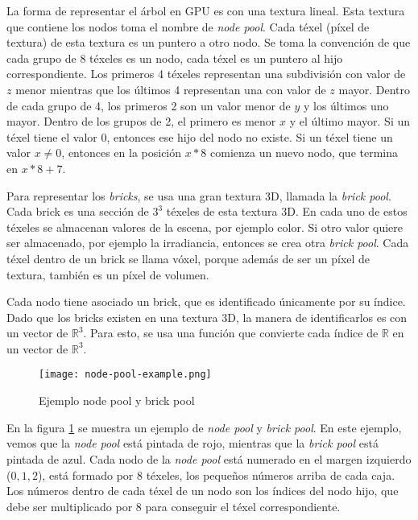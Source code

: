 La forma de representar el árbol en GPU es con una textura lineal.
Esta textura que contiene los nodos toma el nombre de \textit{node pool}.
Cada téxel (píxel de textura) de esta textura es un puntero a otro nodo.
Se toma la convención de que cada grupo de 8 téxeles es un nodo, cada téxel es un puntero al hijo correspondiente.
Los primeros 4 téxeles representan una subdivisión con valor de $z$ menor mientras que los últimos 4 representan una con valor de $z$ mayor.
Dentro de cada grupo de 4, los primeros 2 son un valor menor de $y$ y los últimos uno mayor.
Dentro de los grupos de 2, el primero es menor $x$ y el último mayor.
Si un téxel tiene el valor $0$, entonces ese hijo del nodo no existe.
Si un téxel tiene un valor $x \not = 0$, entonces en la posición $x * 8$ comienza un nuevo nodo, que termina en $x * 8 + 7$.

Para representar los \textit{bricks}, se usa una gran textura 3D, llamada la \textit{brick pool}.
Cada brick es una sección de $3^3$ téxeles de esta textura 3D.
En cada uno de estos téxeles se almacenan valores de la escena, por ejemplo color.
Si otro valor quiere ser almacenado, por ejemplo la irradiancia, entonces se crea otra \textit{brick pool}.
Cada téxel dentro de un brick se llama vóxel, porque además de ser un píxel de textura, también es un píxel de volumen.

Cada nodo tiene asociado un brick, que es identificado únicamente por su índice.
Dado que los bricks existen en una textura 3D, la manera de identificarlos es con un vector de $\mathbb{R}^3$.
Para esto, se usa una función que convierte cada índice de $\mathbb{R}$ en un vector de $\mathbb{R}^3$.

\begin{figure}[h!]
    \centering
    \texttt{[image: node-pool-example.png]}
    \caption{Ejemplo node pool y brick pool}
    \label{fig:node_pool_example}
\end{figure}

En la figura \ref{fig:node_pool_example} se muestra un ejemplo de \textit{node pool} y \textit{brick pool}.
En este ejemplo, vemos que la \textit{node pool} está pintada de rojo, mientras que la \textit{brick pool} está pintada de azul.
Cada nodo de la \textit{node pool} está numerado en el margen izquierdo ($0, 1, 2$), está formado por $8$ téxeles, los pequeños números arriba de cada caja.
Los números dentro de cada téxel de un nodo son los índices del nodo hijo, que debe ser multiplicado por $8$ para conseguir el téxel correspondiente.

